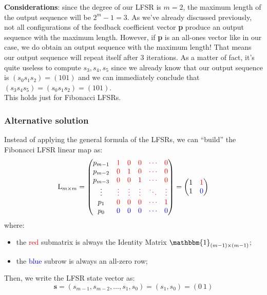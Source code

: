 \documentclass[11pt, a4paper]{article}
\newcommand{\doublequotes}[1]{“#1”}
\newcommand{\rosso}[1]{\textcolor{red}{#1}}
\newcommand{\blu}[1]{\textcolor{blue}{#1}}
\newcommand{\idMatrix}{\mathbbm{1}}
\begin{document}
\textbf{Considerations}: since the degree of our LFSR is $m=2$, the maximum length of the output sequence will be $2^m-1=3$. As we've already discussed previously, not all configurations of the feedback coefficient vector \textbf{p} produce an output sequence with the maximum length. However, if \textbf{p} is an all-ones vector like in our case, we do obtain an output sequence with the maximum length! That means our output sequence will repeat itself after 3 iterations. As a matter of fact, it's quite useless to compute $s_3, s_4, s_5$ since we already know that our output sequence is $(s_0s_1s_2)=(101)$ and we can immediately conclude that $(s_3s_4s_5)=(s_0s_1s_2)=(101)$.\\
This holds just for Fibonacci LFSRs.

\newpage
\subsubsection*{Alternative solution}
Instead of applying the general formula of the LFSRs, we can \doublequotes{build} the Fibonacci LFSR linear map as:
$$
    \text{L}_{m\times m}=
    \begin{pmatrix}
        p_{m-1} & \rosso{1} & \rosso{0} & \rosso{0} & \rosso{\cdots} & \rosso{0}\\
        p_{m-2} & \rosso{0} & \rosso{1} & \rosso{0} & \rosso{\cdots} & \rosso{0}\\
        p_{m-3} & \rosso{0} & \rosso{0} & \rosso{1} & \rosso{\cdots} & \rosso{0}\\
        \vdots&\rosso{\vdots}&\rosso{\vdots}&\rosso{\vdots}&\rosso{\ddots}&\rosso{\vdots}\\
        p_1     & \rosso{0} & \rosso{0} & \rosso{0} & \rosso{\cdots} & \rosso{1}\\
        p_0     & \blu{0} & \blu{0} & \blu{0} & \blu{\cdots} & \blu{0}
    \end{pmatrix}
    =
    \begin{pmatrix}
        1 & \rosso{1}\\
        1 & \blu{0}
    \end{pmatrix}
$$
where:
\begin{itemize}
    \item the \rosso{red} submatrix is always the Identity Matrix $\idMatrix_{(m-1)\times(m-1)}$;
    \item the \blu{blue} subrow is always an all-zero row;
\end{itemize}
Then, we write the LFSR state vector as:
$$\textbf{s}=(s_{m-1},s_{m-2},...,s_1,s_0)=(s_1,s_0)=(0\ 1)$$
\end{document}
